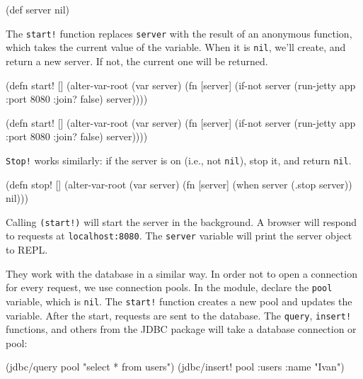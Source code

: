 \begin{clojure}
(def server nil)
\end{clojure}

The \verb|start!| function replaces \verb|server| with the result of an anonymous function, which takes the current value of the variable.
When it is \verb|nil|, we'll create, and return a new server. If not, the current one will be returned.

\ifx\DEVICETYPE\MOBILE

\begin{clojure}
(defn start! []
  (alter-var-root
   (var server)
   (fn [server]
     (if-not server
       (run-jetty app {:port 8080
                       :join? false})
       server))))
\end{clojure}

\else

\begin{clojure}
(defn start! []
  (alter-var-root
   (var server)
   (fn [server]
     (if-not server
       (run-jetty app {:port 8080 :join? false})
       server))))
\end{clojure}

\fi

\noindent
\verb|Stop!| works similarly: if the server is on (i.e., not \verb|nil|), stop it, and return \verb|nil|.

\begin{clojure}
(defn stop! []
  (alter-var-root
   (var server)
   (fn [server]
     (when server
       (.stop server))
     nil)))
\end{clojure}

\noindent
Calling \verb|(start!)| will start the server in the background. A browser will respond to requests at \texttt{localhost\-:8080}.
The \verb|server| variable will print the server object to REPL.


They work with the database in a similar way.
In order not to open a connection for every request, we use connection pools.
In the module, declare the \verb|pool| variable, which is \verb|nil|.
The \verb|start!| function creates a new pool and updates the variable. After the start, requests are sent to the database. The \verb|query|, \verb|insert!| functions, and others from the JDBC package will take a database connection or pool:

\ifx\DEVICETYPE\MOBILE

\begin{clojure}
(jdbc/query pool "select * from users")
(jdbc/insert! pool
  :users {:name "Ivan"})
\end{clojure}

